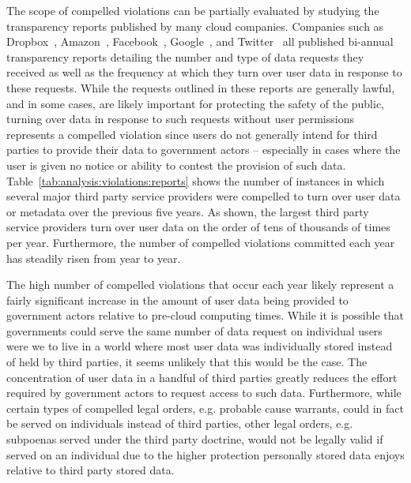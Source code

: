 The scope of compelled violations can be partially evaluated by
studying the transparency reports published by many cloud
companies. Companies such as Dropbox~\cite{dropbox-transparency},
Amazon~\cite{amazon-transparency},
Facebook~\cite{facebook-transparency},
Google~\cite{google-transparency}, and
Twitter~\cite{twitter-transparency} all published bi-annual
transparency reports detailing the number and type of data requests
they received as well as the frequency at which they turn over user
data in response to these requests. While the requests outlined in
these reports are generally lawful, and in some cases, are likely
important for protecting the safety of the public, turning over data
in response to such requests without user permissions represents a
compelled violation since users do not generally intend for third
parties to provide their data to government actors -- especially in
cases where the user is given no notice or ability to contest the
provision of such data. Table~\ref{tab:analysis:violations:reports}
shows the number of instances in which several major third party
service providers were compelled to turn over user data or metadata
over the previous five years. As shown, the largest third party
service providers turn over user data on the order of tens of
thousands of times per year. Furthermore, the number of compelled
violations committed each year has steadily risen from year to year.

The high number of compelled violations that occur each year likely
represent a fairly significant increase in the amount of user data
being provided to government actors relative to pre-cloud computing
times. While it is possible that governments could serve the same
number of data request on individual users were we to live in a world
where most user data was individually stored instead of held by third
parties, it seems unlikely that this would be the case. The
concentration of user data in a handful of third parties greatly
reduces the effort required by government actors to request access to
such data. Furthermore, while certain types of compelled legal orders,
e.g. probable cause warrants, could in fact be served on individuals
instead of third parties, other legal orders, e.g.  subpoenas served
under the third party doctrine, would not be legally valid if served
on an individual due to the higher protection personally stored data
enjoys relative to third party stored data.

